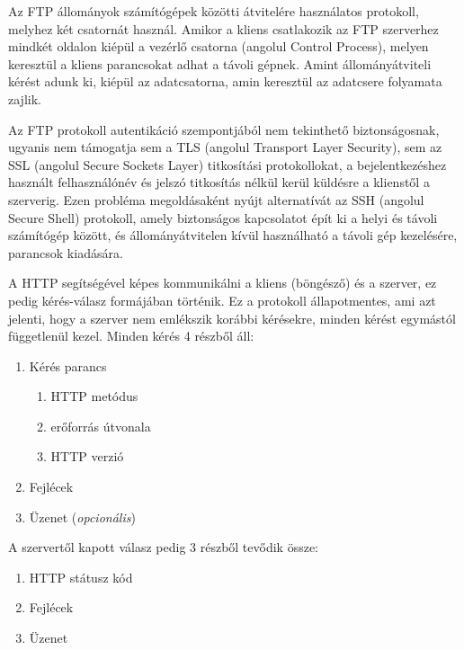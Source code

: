 \documentclass[
]{thesis-ekf}
\theoremstyle{definition}
\theoremstyle{remark}
\begin{document}
Az FTP állományok számítógépek közötti átvitelére használatos protokoll, melyhez két csatornát használ. Amikor a kliens csatlakozik az FTP szerverhez mindkét oldalon kiépül a vezérlő csatorna (angolul Control Process), melyen keresztül a kliens parancsokat adhat a távoli gépnek. Amint állományátviteli kérést adunk ki, kiépül az adatcsatorna, amin keresztül az adatcsere folyamata zajlik. 

Az FTP protokoll autentikáció szempontjából nem tekinthető biztonságosnak, ugyanis nem támogatja sem a TLS (angolul Transport Layer Security), sem az SSL (angolul Secure Sockets Layer) titkosítási protokollokat, a bejelentkezéshez használt felhasználónév és jelszó titkosítás nélkül kerül küldésre a klienstől a szerverig. Ezen probléma megoldásaként nyújt alternatívát az SSH (angolul Secure Shell) protokoll, amely biztonságos kapcsolatot épít ki a helyi és távoli számítógép között, és állományátvitelen kívül használható a távoli gép kezelésére, parancsok kiadására.


A HTTP segítségével képes kommunikálni a kliens (böngésző) és a szerver, ez pedig kérés-válasz formájában történik. Ez a protokoll állapotmentes, ami azt jelenti, hogy a szerver nem emlékszik korábbi kérésekre, minden kérést egymástól függetlenül kezel. 
Minden kérés 4 részből áll:
\begin{enumerate}
	\item Kérés parancs
		\begin{enumerate}
			\item HTTP metódus
			\item erőforrás útvonala
			\item HTTP verzió
		\end{enumerate}
	\item Fejlécek
	\item Üzenet (\emph{opcionális})
\end{enumerate}
A szervertől kapott válasz pedig 3 részből tevődik össze:
\begin{enumerate}
	\item HTTP státusz kód
	\item Fejlécek
	\item Üzenet
\end{enumerate}
\end{document}
